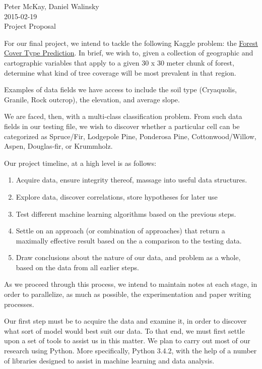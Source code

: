 \documentclass{article}
\begin{document}
\begin{center}
Peter McKay, Daniel Walinsky\\
2015-02-19\\
\Large Project Proposal
\end{center}

\bigskip
For our final project, we intend to tackle the following Kaggle problem:
the 
\href{http://www.kaggle.com/c/forest-cover-type-prediction}{Forest Cover Type Prediction}.
In brief, we wish to, given a collection of geographic and cartographic 
variables that apply to a given 30 x 30 meter chunk of forest, determine 
what kind of tree coverage will be most prevalent in that region.

Examples of data fields we have access to include the soil type 
(Cryaquolis, Granile, Rock outcrop), the elevation, and average slope.

We are faced, then, with a multi-class classification problem. From such 
data fields in our testing file, we wish to discover whether a 
particular cell can be categorized as
Spruce/Fir,
Lodgepole Pine,
Ponderosa Pine,
Cottonwood/Willow,
Aspen,
Douglas-fir, or
Krummholz.

Our project timeline, at a high level is as follows:
\begin{enumerate}
\item Acquire data, ensure integrity thereof, massage into useful data 
structures.
\item Explore data, discover correlations, store hypotheses for later 
  use
\item Test different machine learning algorithms based on the previous 
  steps.
\item Settle on an approach (or combination of approaches) that return 
  a maximally effective result based on the a comparison to the testing 
  data.
\item Draw conclusions about the nature of our data, and problem as a 
  whole, based on the data from all earlier steps.
\end{enumerate}

As we proceed through this process, we intend to maintain notes at each 
stage, in order to parallelize, as much as possible, the experimentation 
and paper writing processes.



Our first step must be to acquire the data and examine it, in order to 
discover what sort of model would best suit our data.  To that end, we 
must first settle upon a set of tools to assist us in this matter.  
We plan to carry out most of our research using Python.  More 
specifically, Python 3.4.2, with the help of a number of libraries designed 
to assist in machine learning and data analysis.  
\end{document}
